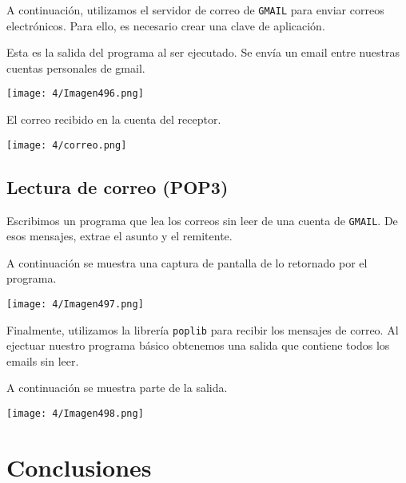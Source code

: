 A continuación, utilizamos el servidor de correo de \verb#GMAIL# para enviar correos electrónicos.
Para ello, es necesario crear una clave de aplicación.

Esta es la salida del programa al ser ejecutado.
Se envía un email entre nuestras cuentas personales de gmail.

\begin{minipage}{\linewidth}
	\centering
	\texttt{[image: 4/Imagen496.png]}
	\label{fig:4/14}
\end{minipage}

El correo recibido en la cuenta del receptor.

\begin{minipage}{\linewidth}
	\centering
	\texttt{[image: 4/correo.png]}
	\label{fig:4/15}
\end{minipage}

\subsection{Lectura de correo (POP3)}

Escribimos un programa que lea los correos sin leer de una cuenta de \verb#GMAIL#.
De esos mensajes, extrae el asunto y el remitente.

A continuación se muestra una captura de pantalla de lo retornado por el programa.

\begin{minipage}{\linewidth}
	\centering
	\texttt{[image: 4/Imagen497.png]}
	\label{fig:4/16}
\end{minipage}

Finalmente, utilizamos la librería \verb#poplib# para recibir los mensajes de correo.
Al ejectuar nuestro programa básico obtenemos una salida que contiene todos los emails
sin leer.

A continuación se muestra parte de la salida.

\begin{minipage}{\linewidth}
	\centering
	\texttt{[image: 4/Imagen498.png]}
	\label{fig:4/17}
\end{minipage}

\section{Conclusiones}


